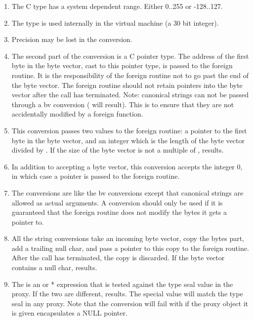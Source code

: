 \documentclass[letterpaper,10pt,english]{sphinxmanual}
\begin{document}
\begin{enumerate}
\item {} 
The C type  has a system dependent range. Either 0..255 or -128..127.

\item {} 
The type  is used internally in the virtual machine (a 30 bit integer).

\item {} 
Precision may be lost in the conversion.

\item {} 
The second part of the conversion is a C pointer type. The address of the first byte in the byte
vector, cast to this pointer type, is passed to the foreign routine. It is the responsibility of
the foreign routine not to go past the end of the byte vector. The foreign routine should not retain
pointers into the byte vector after the call has terminated. Note: canonical strings can not be passed
through a bv conversion ( will result). This is to ensure that they are not accidentally
modified by a foreign function.

\item {} 
This conversion passes two values to the foreign routine: a pointer to the first byte in the byte
vector, and an integer which is the length of the byte vector divided by . If
the size of the byte vector is not a multiple of ,  results.

\item {} 
In addition to accepting a byte vector, this conversion accepts the integer 0, in which case a 
pointer is passed to the foreign routine.

\item {} 
The  conversions are like the bv conversions except that canonical strings are allowed as actual
arguments. A  conversion should only be used if it is guaranteed that the foreign routine
does not modify the bytes it gets a pointer to.

\item {} 
All the string conversions take an incoming byte vector, copy the bytes part, add a trailing null
char, and pass a pointer to this copy to the foreign routine. After the call has terminated, the copy
is discarded. If the byte vector contains a null char,  results.

\item {} 
The  is an  or  * expression that is tested against the type seal value in the
proxy. If the two are different,  results. The special value  will
match the type seal in any proxy. Note that the  conversion will fail with 
if the proxy object it is given encapsulates a NULL pointer.


\end{enumerate}
\end{document}
